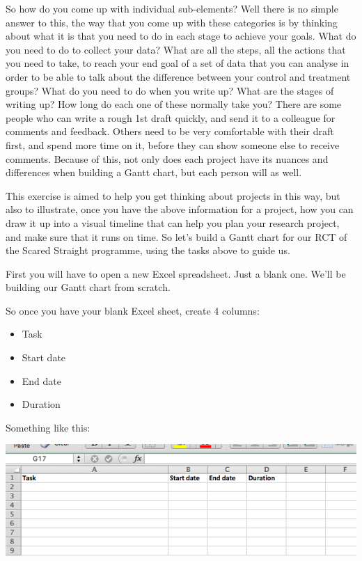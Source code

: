 \documentclass[]{book}
\providecommand{\tightlist}{%
  \setlength{\itemsep}{0pt}\setlength{\parskip}{0pt}}
\theoremstyle{definition}
\theoremstyle{definition}
\theoremstyle{definition}
\theoremstyle{remark}
\begin{document}
So how do you come up with individual sub-elements? Well there is no
simple answer to this, the way that you come up with these categories is
by thinking about what it is that you need to do in each stage to
achieve your goals. What do you need to do to collect your data? What
are all the steps, all the actions that you need to take, to reach your
end goal of a set of data that you can analyse in order to be able to
talk about the difference between your control and treatment groups?
What do you need to do when you write up? What are the stages of writing
up? How long do each one of these normally take you? There are some
people who can write a rough 1st draft quickly, and send it to a
colleague for comments and feedback. Others need to be very comfortable
with their draft first, and spend more time on it, before they can show
someone else to receive comments. Because of this, not only does each
project have its nuances and differences when building a Gantt chart,
but each person will as well.

This exercise is aimed to help you get thinking about projects in this
way, but also to illustrate, once you have the above information for a
project, how you can draw it up into a visual timeline that can help you
plan your research project, and make sure that it runs on time. So let's
build a Gantt chart for our RCT of the Scared Straight programme, using
the tasks above to guide us.

First you will have to open a new Excel spreadsheet. Just a blank one.
We'll be building our Gantt chart from scratch.

So once you have your blank Excel sheet, create 4 columns:

\begin{itemize}
\tightlist
\item
  Task
\item
  Start date
\item
  End date
\item
  Duration
\end{itemize}

Something like this:

\includegraphics{imgs/gantt_headers.png}
\end{document}
